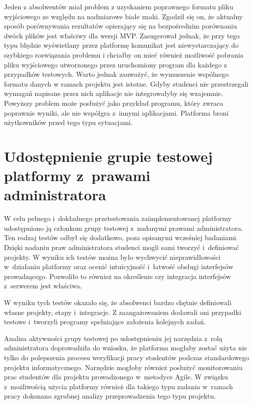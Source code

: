 Jeden z absolwentów miał problem z uzyskaniem poprawnego formatu pliku wyjściowego ze względu na nadmiarowe białe znaki.
Zgodził się on, że aktualny sposób porównywania rezultatów opierający się na bezpośrednim porównaniu dwóch plików jest właściwy dla wersji MVP.
Zasugerował jednak, że przy tego typu błędzie wyświetlany przez platformę komunikat jest niewystarczający do szybkiego rozwiązania problemu i chciałby on mieć również możliwość pobrania pliku wyjściowego utworzonego przez uruchomiony program dla każdego z przypadków testowych.
Warto jednak zauważyć, że wymuszenie wspólnego formatu danych w ramach projektu jest istotne.
Gdyby studenci nie przestrzegali wymagań napisane przez nich aplikacje nie integrowałyby się wzajemnie.
Powyższy problem może posłużyć jako przykład programu, który zwraca poprawnie wyniki, ale nie współgra z~innymi aplikacjami.
Platforma broni użytkowników przed tego typu sytuacjami.

\section{Udostępnienie grupie testowej platformy z~prawami administratora}

W celu pełnego i~dokładnego przetestowania zaimplementowanej platformy udostępniono ją członkom grupy testowej z~nadanymi prawami administratora.
Ten rodzaj testów odbył się dodatkowo, poza opisanymi wcześniej badaniami.
Dzięki nadaniu praw administratora studenci mogli sami tworzyć i~definiować projekty.
W wyniku ich testów można było wychwycić nieprawidłowości w~działaniu platformy oraz ocenić intuicyjność i~łatwość obsługi interfejsów prowadzącego.
Pozwoliło to również na określenie czy integracja interfejsów z~serwerem jest właściwa.

W wyniku tych testów okazało się, że absolwenci bardzo chętnie definiowali własne projekty, etapy i~integracje.
Z zaangażowaniem dodawali oni przypadki testowe i~tworzyli programy spełniające założenia kolejnych zadań.

Analiza aktywności grupy testowej po udostępnieniu jej narzędzia z~rolą administratora doprowadziła do wniosku, że platforma mogłaby zostać użyta nie tylko do polepszenia procesu weryfikacji pracy studentów podczas standardowego projektu informatycznego.
Narzędzie mogłoby również posłużyć monitorowaniu prac studentów dla projektu prowadzonego w~metodyce Agile.
W związku z~możliwością użycia platformy również dla takiego typu zadania w~ramach pracy dokonano zgrubnej analizy przeprowadzenia tego typu projektu.


